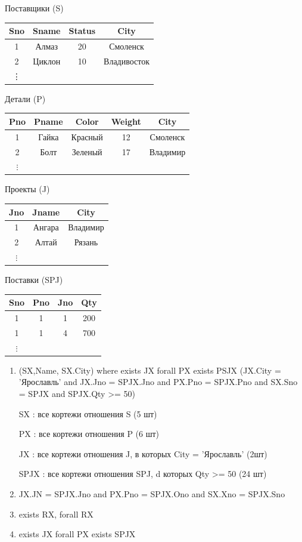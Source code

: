 \documentclass[a4paper, 14pt]{report}
\begin{document}
Поставщики (S)

\begin{tabular}{|c|c|c|c|}
    \hline
    Sno & Sname & Status & City \\
    \hline
    1 & Алмаз & 20 & Смоленск\\
    \hline
    2 & Циклон & 10 & Владивосток \\
    \hline
    \vdots & & & \\
\end{tabular}

Детали (P)

\begin{tabular}{|c|c|c|c|c|}
    \hline
    Pno & Pname & Color & Weight & City \\
    \hline
    1 & Гайка & Красный & 12 & Смоленск\\
    \hline
    2 & Болт & Зеленый & 17 & Владимир\\
    \hline
    $\vdots$ & & & & \\
\end{tabular}

Проекты (J)

\begin{tabular}{|c|c|c|}
    \hline
    Jno & Jname & City \\
    \hline
    1 & Ангара & Владимир \\
    \hline
    2 & Алтай & Рязань \\
    \hline
    $\vdots$ & & \\
\end{tabular}

Поставки (SPJ)

\begin{tabular}{|c|c|c|c|}
    \hline
    Sno & Pno & Jno & Qty \\
    \hline
    1 & 1 & 1 & 200 \\
    \hline
    1 & 1 & 4 & 700 \\
    \hline
    $\vdots$ & & & \\
\end{tabular}

\begin{enumerate}
    \item (SX,Name, SX.City) where exists JX forall PX exists PSJX (JX.City = 'Ярославль' and JX.Jno = SPJX.Jno and PX.Pno = SPJX.Pno and SX.Sno = SPJX and SPJX.Qty >= 50)

SX : все кортежи отношения S (5 шт)

PX : все кортежи отношения P (6 шт)

JX : все кортежи отношения J, в которых City = 'Ярославль' (2шт)

SPJX : все кортежи отношения SPJ, d которых Qty >= 50 (24 шт)

    \item JX.JN = SPJX.Jno and PX.Pno = SPJX.Ono and SX.Xno = SPJX.Sno

    \item exists RX, forall RX

    \item exists JX forall PX exists SPJX

\end{enumerate}
\end{document}
